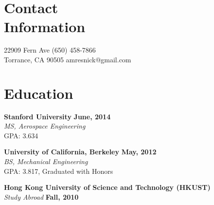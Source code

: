 \documentclass[margin,line]{resume}
\begin{document}
\begin{resume}

    \section{\mysidestyle Contact\\Information}

    22909 Fern Ave						                           \hfill (650) 458-7866\\
    Torrance, CA 90505								\hfill amresnick@gmail.com

    \section{\mysidestyle Education}

    \textbf{Stanford University} \hfill \textbf{June, 2014} \\%
    \textsl{MS, Aerospace Engineering} \\%
    GPA: 3.634

    \textbf{University of California, Berkeley} \hfill \textbf{May, 2012}\\%
    \textsl{BS, Mechanical Engineering} \\%
    GPA: 3.817, Graduated with Honors

    \textbf{Hong Kong University of Science and Technology (HKUST)}\\
    \textsl{Study Abroad} \hfill \textbf{Fall, 2010}\\ \vspace{-5mm}



\end{resume}
\end{document}
